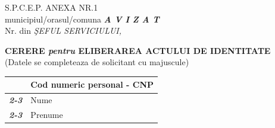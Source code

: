 \documentclass[11pt,a4paper]{article}
\newcommand{\fillline}[1][6cm]{\underline{\hspace{#1}}}
\newcommand{\fillbox}[1][0.4cm]{\framebox[#1]{\rule{0pt}{#1}}}
\begin{document}
\begin{flushleft}
S.P.C.E.P. \fillline[6cm] \hfill ANEXA NR.1\\
\hspace*{1cm}\footnotesize municipiul/orasul/comuna \hfill \normalsize \textbf{\textit{A V I Z A T}}\\
Nr. \fillline[3cm] din \fillline[3cm] \hfill \textit{ŞEFUL SERVICIULUI,}
\end{flushleft}

\vspace{0.5cm}

\begin{center}
{\Large\textbf{CERERE \textit{pentru} ELIBERAREA ACTULUI DE IDENTITATE}}\\
\footnotesize (Datele se completeaza de solicitant cu majuscule)
\end{center}

\vspace{0.3cm}

\begin{tabularx}{\textwidth}{|>{\bfseries\itshape}m{2.6cm}|m{3cm}|X|}
\hline
\multirow{2}{*}{Subsemnatul:} & \multicolumn{2}{l|}{Cod numeric personal - CNP \quad \fillbox \fillbox \fillbox \fillbox \fillbox \fillbox \fillbox \fillbox \fillbox \fillbox \fillbox \fillbox \fillbox} \\
\cline{2-3}
 & Nume & \\
\cline{2-3}
 & Prenume & \\
\hline
\end{tabularx}
\end{document}
